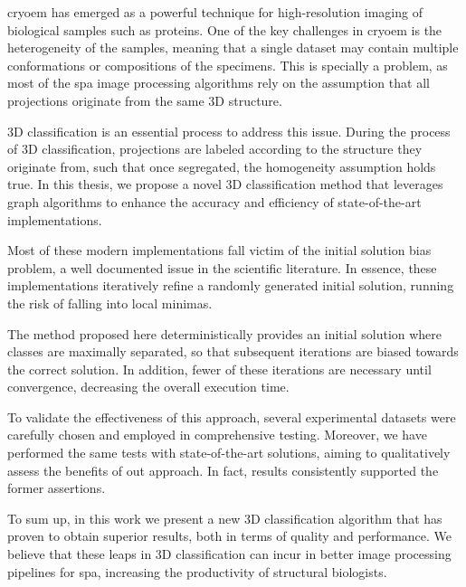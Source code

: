 \documentclass[../main.tex]{subfiles}
\begin{document}
\Gls{cryoem} has emerged as a powerful technique for high-resolution imaging of biological samples such as proteins. One of the key challenges in \gls{cryoem} is the heterogeneity of the samples, meaning that a single dataset may contain multiple conformations or compositions of the specimens. This is specially a problem, as most of the \gls{spa} image processing algorithms rely on the assumption that all projections originate from the same 3D structure. 

3D classification is an essential process to address this issue. During the process of 3D classification, projections are labeled according to the structure they originate from, such that once segregated, the homogeneity assumption holds true. In this thesis, we propose a novel 3D classification method that leverages graph algorithms to enhance the accuracy and efficiency of state-of-the-art implementations.

Most of these modern implementations fall victim of the initial solution bias problem, a well documented issue in the scientific literature. In essence, these implementations iteratively refine a randomly generated initial solution, running the risk of falling into local minimas. 

The method proposed here deterministically provides an initial solution where classes are maximally separated, so that subsequent iterations are biased towards the correct solution. In addition, fewer of these iterations are necessary until convergence, decreasing the overall execution time.

To validate the effectiveness of this approach, several experimental datasets were carefully chosen and employed in comprehensive testing. Moreover, we have performed the same tests with state-of-the-art solutions, aiming to qualitatively assess the benefits of out approach. In fact, results consistently supported the former assertions. 

To sum up, in this work we present a new 3D classification algorithm that has proven to obtain superior results, both in terms of quality and performance. We believe that these leaps in 3D classification can incur in better image processing pipelines for \gls{spa}, increasing the productivity of structural biologists.
\end{document}
